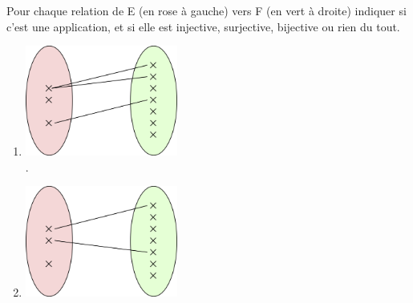 \documentclass[a4paper,11pt]{article}
\begin{document}
	
\exo{}

Pour chaque relation de E (en rose à gauche) vers F (en vert à droite) indiquer si c'est une application, et si elle est injective, surjective, bijective ou rien du tout. 

\begin{multicols}{2}

\def\myw{5cm}
\begin{enumerate}[\bfseries 1.]
	\item 	\includegraphics[width=\myw]{1.png}\\
	
			.\dotfill

	\item 	\includegraphics[width=\myw]{2.png}\\
	

\end{enumerate}
\end{multicols}
\end{document}
